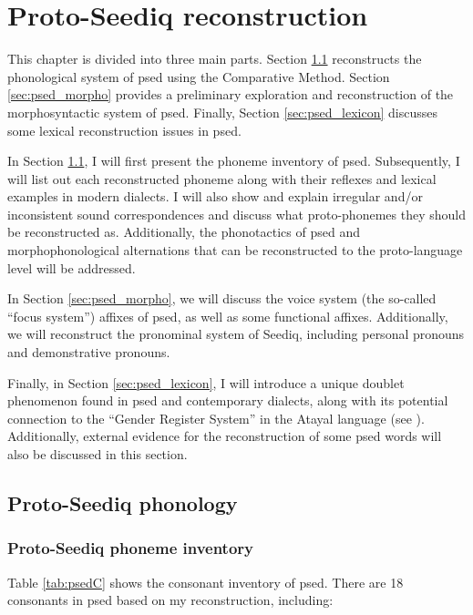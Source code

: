 \chapter{Proto-Seediq reconstruction}\label{ch4}

This chapter is divided into three main parts. Section \ref{sec:psed_phono} reconstructs the phonological system of \acl{psed} using the Comparative Method. Section \ref{sec:psed_morpho} provides a preliminary exploration and reconstruction of the morphosyntactic system of \acl{psed}. Finally, Section \ref{sec:psed_lexicon} discusses some lexical reconstruction issues in \acl{psed}.

In Section \ref{sec:psed_phono}, I will first present the phoneme inventory of \acl{psed}. Subsequently, I will list out each reconstructed phoneme along with their reflexes and lexical examples in modern dialects. I will also show and explain irregular and/or inconsistent sound correspondences and discuss what proto-phonemes they should be reconstructed as. Additionally, the phonotactics of \acl{psed} and morphophonological alternations that can be reconstructed to the proto-language level will be addressed.

In Section \ref{sec:psed_morpho}, we will discuss the voice system (the so-called ``focus system'') affixes of \acl{psed}, as well as some functional affixes. Additionally, we will reconstruct the pronominal system of Seediq, including personal pronouns and demonstrative pronouns.

Finally, in Section \ref{sec:psed_lexicon}, I will introduce a unique doublet phenomenon found in \acl{psed} and contemporary dialects, along with its potential connection to the ``Gender Register System'' in the Atayal language (see \cite{li1980gender,li1982gender,li1983gender,goderich2020phd}). Additionally, external evidence for the reconstruction of some \acl{psed} words will also be discussed in this section.

\section{Proto-Seediq phonology} \label{sec:psed_phono}

\subsection{Proto-Seediq phoneme inventory}

Table \ref{tab:psedC} shows the consonant inventory of \acl{psed}. There are 18 consonants in \acl{psed} based on my reconstruction, including:

